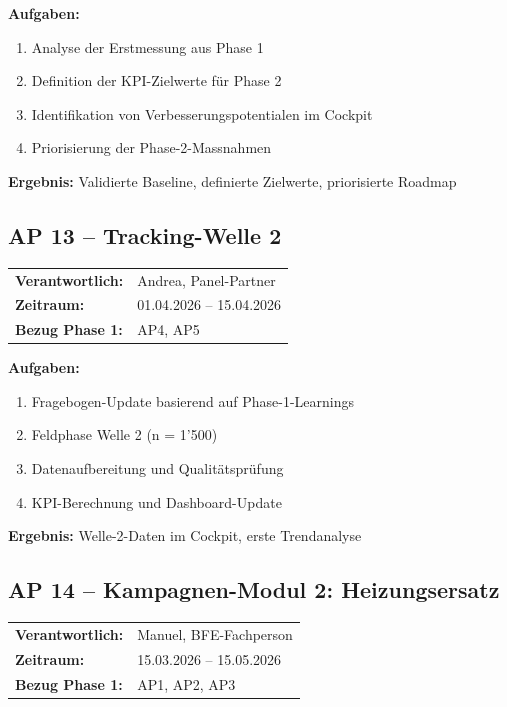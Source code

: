 \documentclass[11pt,a4paper]{article}
\begin{document}
\textbf{Aufgaben:}
\begin{enumerate}[label=AP12.\arabic*]
    \item Analyse der Erstmessung aus Phase 1
    \item Definition der KPI-Zielwerte für Phase 2
    \item Identifikation von Verbesserungspotentialen im Cockpit
    \item Priorisierung der Phase-2-Massnahmen
\end{enumerate}

\textbf{Ergebnis:} Validierte Baseline, definierte Zielwerte, priorisierte Roadmap

\subsection{AP 13 -- Tracking-Welle 2}

\begin{tabular}{ll}
\textbf{Verantwortlich:} & Andrea, Panel-Partner\\
\textbf{Zeitraum:} & 01.04.2026 -- 15.04.2026\\
\textbf{Bezug Phase 1:} & AP4, AP5\\
\end{tabular}

\textbf{Aufgaben:}
\begin{enumerate}[label=AP13.\arabic*]
    \item Fragebogen-Update basierend auf Phase-1-Learnings
    \item Feldphase Welle 2 (n = 1'500)
    \item Datenaufbereitung und Qualitätsprüfung
    \item KPI-Berechnung und Dashboard-Update
\end{enumerate}

\textbf{Ergebnis:} Welle-2-Daten im Cockpit, erste Trendanalyse

\subsection{AP 14 -- Kampagnen-Modul 2: Heizungsersatz}

\begin{tabular}{ll}
\textbf{Verantwortlich:} & Manuel, BFE-Fachperson\\
\textbf{Zeitraum:} & 15.03.2026 -- 15.05.2026\\
\textbf{Bezug Phase 1:} & AP1, AP2, AP3\\
\end{tabular}
\end{document}
